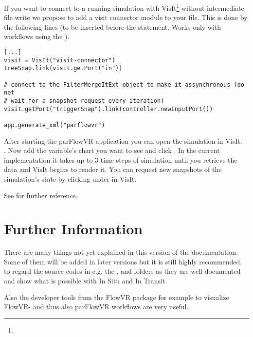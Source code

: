 If you want to connect to a running simulation with VisIt\footnote{}
without intermediate file write
we propose to add a visit connector module to your  file.
This is done by the following lines (to be inserted before the
 statement. Works only with workflows using the ).
\begin{display}\begin{verbatim}
[...]
visit = VisIt("visit-connector")
treeSnap.link(visit.getPort("in"))

# connect to the FilterMergeItExt object to make it assynchronous (do not
# wait for a snapshot request every iteration)
visit.getPort("triggerSnap").link(controller.newInputPort())

app.generate_xml("parflowvr")
\end{verbatim}\end{display}
After starting the parFlowVR application you can open the simulation in VisIt:\\
. Now add the variable's
chart you want to see and click . In the current implementation it takes up to 3 time steps of
simulation until you retrieve the data and VisIt begins
to render it. You can request new snapshots of the simulation's state by clicking
 under  in VisIt.

See  for further reference.

\section{Further Information}
There are many things not yet explained in this version of the documentation.
Some of them
will be added in later versions but it is still highly recommended, to regard the source codes in e.g.
the  , 
and  folders as they are well documented and show what is possible with In Situ and In Transit.

Also the developer tools from the FlowVR package for example  to
visualize FlowVR- and thus also parFlowVR workflows are very useful.

